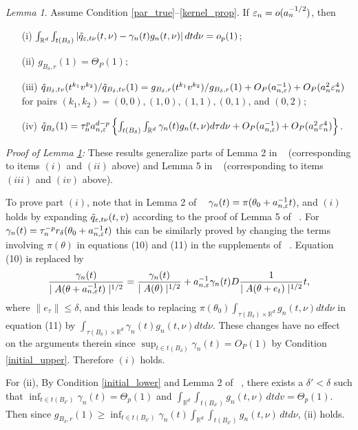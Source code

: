 \documentclass[9pt]{article}
\theoremstyle{remark}
\newtheorem{lemma}{Lemma}
\begin{document}
\begin{lemma}\label{Alemma2} Assume Condition \ref{par_true}--\ref{kernel_prop}. If $\varepsilon_{n}=o(a_{n}^{-1/2})$, then 
	\begin{enumerate}
		\item[(i)] $\int_{\mathbb{R}^{d}}\int_{t(B_{\delta})}|\tilde{q}_{\varepsilon,t\nu}(t,\nu)-\gamma_{n}(t)g_{n}(t,\nu)|\,dtd\nu=o_{p}(1)$;
		\item[(ii)] $g_{B_{\delta},r}(1)=\Theta_{P}(1);$ 
		\item[(iii)] $\tilde{q}_{B_{\delta},tv}(t^{k_{1}}v^{k_{2}})/\tilde{q}_{B_{\delta},tv}(1)=g_{B_{\delta},r}(t^{k_{1}}v^{k_{2}})/g_{B_{\delta},r}(1)+O_{P}(a_{n,\varepsilon}^{-1})+O_{P}(a_{n}^{2}\varepsilon_{n}^{4})$
		for pairs $(k_{1}, k_{2}) = (0,0), (1,0), (1,1), (0,1)$, and $(0,2)$; 
		\item[(iv)] $\tilde{q}_{B_{\delta}}(1)=\tau_{n}^{p}a_{n,\varepsilon}^{d-p}\left\{ \int_{t(B_{\delta})}\int_{\mathbb{R}^{d}}\gamma_{n}(t)g_{n}(t,\nu)d\tau d\nu+O_{P}(a_{n,\varepsilon}^{-1})+O_{P}(a_{n}^{2}\varepsilon_{n}^{4})\right\} $. 
	\end{enumerate}\end{lemma}
{\it Proof of Lemma \ref{Alemma2}:} 
	These results generalize parts of Lemma 2 in ~\cite{Li2017} (corresponding to items $(i)$ and $(ii)$ above) and Lemma 5 in
	~\cite{Li2016} (corresponding to items $(iii)$ and $(iv)$ above). 
	
	To prove part $(i)$, note that in Lemma 2 of ~\cite{Li2017}  $\gamma_{n}(t)=\pi(\theta_0+a_{n,\varepsilon}^{-1}t)$,
	and $(i)$ holds by expanding $\tilde{q}_{\varepsilon,t\nu}(t,v)$ according to
	the proof of Lemma 5 of ~\cite{Li2016}. 
	For $\gamma_{n}(t)=\tau_{n}^{-p}r_{\delta}(\theta_0+a_{n,\varepsilon}^{-1}t)$ this can be similarly proved by changing the terms involving $\pi(\theta)$ in equations (10) and (11) in the supplements of ~\cite{Li2016}. Equation (10)
	is replaced by 
	\[
	\frac{\gamma_{n}(t)}{\mid A(\theta+a_{n,\varepsilon}^{-1}t)\mid^{1/2}}=\frac{\gamma_{n}(t)}{\mid A(\theta)\mid^{1/2}}+a_{n,\varepsilon}^{-1}\gamma_{n}(t)D\frac{1}{\mid A(\theta+e_{t})\mid^{1/2}}t,
	\]
	where $\|e_{\tau}\|\leq\delta$, and this leads to replacing $\pi(\theta_0)\int_{\tau(B_{\delta})\times\mathbb{R}^{d}}g_{n}(t,\nu)dtd\nu$
	in equation (11) by $\int_{\tau(B_{\delta})\times\mathbb{R}^{d}}\gamma_{n}(t)g_{n}(t,\nu)dtd\nu$.
	These changes have no effect on the arguments therein since $\sup_{t\in t(B_{\delta})}\gamma_{n}(t)=O_{P}(1)$
	by Condition \ref{initial_upper}. Therefore $(i)$ holds.
	
	For (ii), By Condition \ref{initial_lower} and Lemma 2 of ~\cite{Li2017}, there exists a $\delta'<\delta$
	such that $\inf_{t\in t(B_{\delta'})}\gamma_{n}(t)=\Theta_{p}(1)$
	and $\int_{\mathbb{R}^{d}}\int_{t(B_{\delta'})}g_{n}(t,\nu)\,dtdv=\Theta_{p}(1)$.
	Then since $g_{B_{\delta},r}(1)\geq\inf_{t\in t(B_{\delta'})}\gamma_{n}(t)\int_{\mathbb{R}^{d}}\int_{t(B_{\delta'})}g_{n}(t,\nu)\,dtd\nu$,
	(ii) holds.
	
\end{document}
